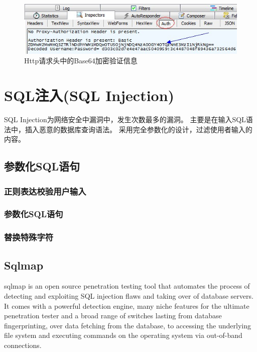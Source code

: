 \documentclass{book}
\begin{document}
\begin{figure}[htbp]
	\centering
	\includegraphics[scale=0.8]{HttpHeaderAuthorizationInfo.jpg}
	\caption{Http请求头中的Base64加密验证信息}
	\label{fig:HttpHeaderAuthorizationInfo}
\end{figure}

\section{SQL注入(SQL Injection)}

SQL Injection为网络安全中漏洞中，发生次数最多的漏洞。
主要是在输入SQL语法中，插入恶意的数据库查询语法。
采用完全参数化的设计，过滤使用者输入的内容。


\subsection{参数化SQL语句}

\subsubsection{正则表达校验用户输入}

\subsubsection{参数化SQL语句}

\subsubsection{替换特殊字符}

\subsection{Sqlmap}

sqlmap is an open source penetration testing tool that automates 
the process of detecting and exploiting SQL injection flaws and 
taking over of database servers. It comes with a powerful detection engine, 
many niche features for the ultimate penetration tester and 
a broad range of switches lasting from database fingerprinting, 
over data fetching from the database, to accessing the 
underlying file system and executing commands on the 
operating system via out-of-band connections.
\end{document}
